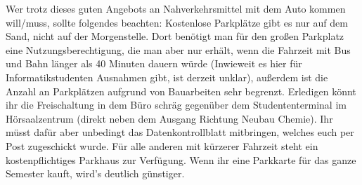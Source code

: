 Wer trotz dieses guten Angebots an Nahverkehrsmittel mit dem Auto kommen will/muss,
  sollte folgendes beachten: Kostenlose Parkplätze gibt es nur auf dem Sand,
  nicht auf der Morgenstelle.  Dort benötigt man für den großen Parkplatz eine Nutzungsberechtigung, die man aber nur erhält,
  wenn die Fahrzeit mit Bus und Bahn länger als 40 Minuten dauern würde (Inwieweit es hier für Informatikstudenten Ausnahmen
  gibt, ist derzeit unklar), außerdem ist die Anzahl an Parkplätzen aufgrund von Bauarbeiten sehr begrenzt.
  Erledigen könnt ihr die Freischaltung in dem Büro
  schräg gegenüber dem Studententerminal im Hörsaalzentrum (direkt neben dem Ausgang Richtung Neubau Chemie).
  Ihr müsst dafür aber unbedingt das Datenkontrollblatt mitbringen,
  welches euch per Post zugeschickt wurde.
  Für alle anderen mit kürzerer Fahrzeit steht ein
  kostenpflichtiges Parkhaus zur Verfügung. Wenn ihr eine Parkkarte für das
  ganze Semester kauft, wird's deutlich günstiger.
  \vspace*{3cm}
 
